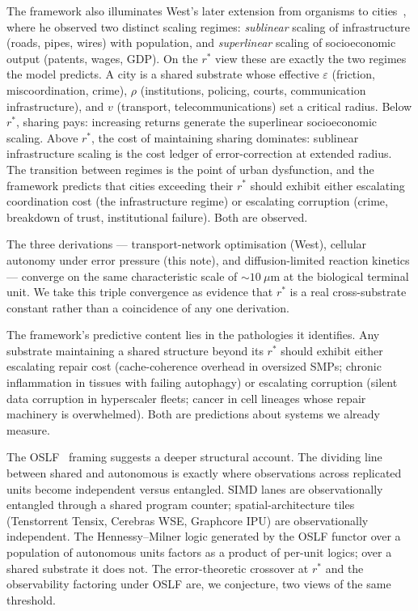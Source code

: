 \documentclass[11pt]{article}
\begin{document}
The framework also illuminates West's later extension from organisms to cities~\cite{west-cities}, where he observed two distinct scaling regimes: \emph{sublinear} scaling of infrastructure (roads, pipes, wires) with population, and \emph{superlinear} scaling of socioeconomic output (patents, wages, GDP). On the $r^{\ast}$ view these are exactly the two regimes the model predicts. A city is a shared substrate whose effective $\varepsilon$ (friction, miscoordination, crime), $\rho$ (institutions, policing, courts, communication infrastructure), and $v$ (transport, telecommunications) set a critical radius. Below $r^{\ast}$, sharing pays: increasing returns generate the superlinear socioeconomic scaling. Above $r^{\ast}$, the cost of maintaining sharing dominates: sublinear infrastructure scaling is the cost ledger of error-correction at extended radius. The transition between regimes is the point of urban dysfunction, and the framework predicts that cities exceeding their $r^{\ast}$ should exhibit either escalating coordination cost (the infrastructure regime) or escalating corruption (crime, breakdown of trust, institutional failure). Both are observed.

The three derivations --- transport-network optimisation (West), cellular autonomy under error pressure (this note), and diffusion-limited reaction kinetics --- converge on the same characteristic scale of $\sim 10~\mu$m at the biological terminal unit. We take this triple convergence as evidence that $r^{\ast}$ is a real cross-substrate constant rather than a coincidence of any one derivation.



The framework's predictive content lies in the pathologies it identifies. Any substrate maintaining a shared structure beyond its $r^{\ast}$ should exhibit either escalating repair cost (cache-coherence overhead in oversized SMPs; chronic inflammation in tissues with failing autophagy) or escalating corruption (silent data corruption in hyperscaler fleets; cancer in cell lineages whose repair machinery is overwhelmed). Both are predictions about systems we already measure.

The OSLF~\cite{f1r3fly-oslf} framing suggests a deeper structural account. The dividing line between shared and autonomous is exactly where observations across replicated units become independent versus entangled. SIMD lanes are observationally entangled through a shared program counter; spatial-architecture tiles (Tenstorrent Tensix, Cerebras WSE, Graphcore IPU) are observationally independent. The Hennessy--Milner logic generated by the OSLF functor over a population of autonomous units factors as a product of per-unit logics; over a shared substrate it does not. The error-theoretic crossover at $r^{\ast}$ and the observability factoring under OSLF are, we conjecture, two views of the same threshold.
\end{document}

